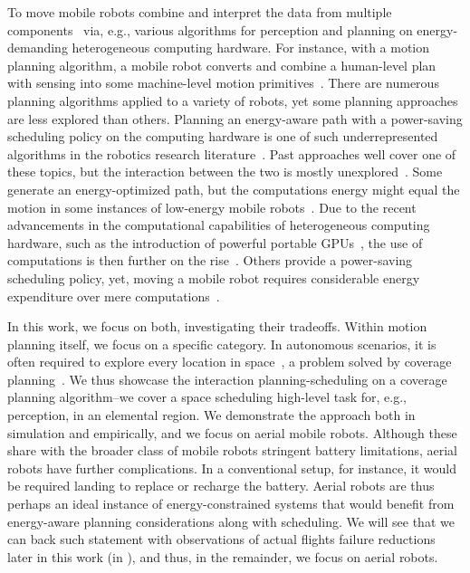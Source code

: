 To move mobile robots combine and interpret the data from multiple components~\citep{mei2006deployment} via, e.g., various algorithms for perception and planning on energy-demanding heterogeneous computing hardware. For instance, with a motion planning algorithm, a mobile robot converts and combine a human-level plan with sensing into some machine-level motion primitives~\citep{lavalle2006planning}. There are numerous planning algorithms applied to a variety of robots, yet some planning approaches are less explored than others. Planning an energy-aware path with a power-saving scheduling policy on the computing hardware is one of such underrepresented algorithms in the robotics research literature~\citep{sudhakar2020balancing,lahijanian2018resource,ondruska2015scheduled,brateman2006energy}. Past approaches well cover one of these topics, but the interaction between the two is mostly unexplored~\citep{brateman2006energy}. Some generate an energy-optimized path, but the computations energy might equal the motion in some instances of low-energy mobile robots~\citep{sudhakar2020balancing}. Due to the recent advancements in the computational capabilities of heterogeneous computing hardware, such as the introduction of powerful portable GPUs~\citep{rizvi2017general}, the use of computations is then further on the rise~\citep{abramov2012real,satria2016real,jaramillo2019visual}. Others provide a power-saving scheduling policy, yet, moving a mobile robot requires considerable energy expenditure over mere computations~\citep{mei2004energy,mei2005case}.

In this work, we focus on both, investigating their tradeoffs. Within motion planning itself, we focus on a specific category. In autonomous scenarios, it is often required to explore every location in space~\citep{cao1988region}, a problem solved by coverage planning~\citep{choset2001coverage}. We thus showcase the interaction planning-scheduling on a coverage planning algorithm--we cover a space scheduling high-level task for, e.g., perception, in an elemental region. We demonstrate the approach both in simulation and empirically, and we focus on aerial mobile robots. Although these share with the broader class of mobile robots stringent battery limitations, aerial robots have further complications. In a conventional setup, for instance, it would be required landing to replace or recharge the battery. Aerial robots are thus perhaps an ideal instance of energy-constrained systems that would benefit from energy-aware planning considerations along with scheduling. We will see that we can back such statement with observations of actual flights failure reductions later in this work (in ), and thus,  in the remainder, we focus on aerial robots.

